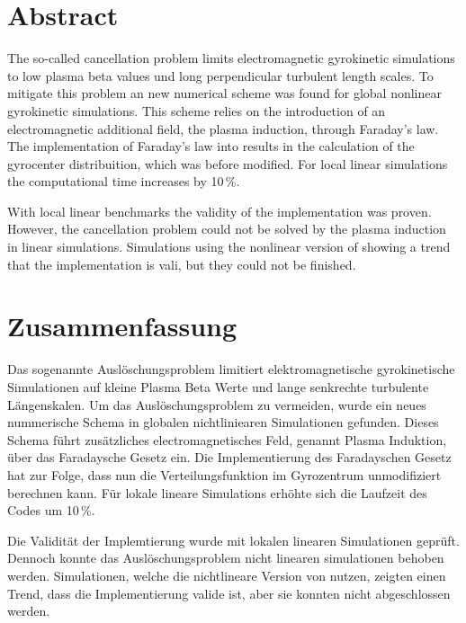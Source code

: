 \chapter*{Abstract}
\label{chap:abstractENG}

The so-called cancellation problem limits electromagnetic gyrokinetic simulations to low plasma beta values und long perpendicular turbulent length scales. To mitigate this problem an new numerical scheme was found for global nonlinear gyrokinetic simulations. This scheme relies on the introduction of an electromagnetic additional field, the plasma induction, through Faraday's law. The implementation of Faraday's law into {\gkw} results in the calculation of the gyrocenter distribuition, which was before modified. For local linear simulations the computational time increases by 10\,\%. \bigskip

With local linear benchmarks the validity of the implementation was proven. However, the cancellation problem could not be solved by the plasma induction in linear simulations. Simulations using the nonlinear version of {\gkw} showing a trend that the implementation is vali, but they could not be finished.

\chapter*{Zusammenfassung}
\label{chap:abstractDE}

Das sogenannte Auslöschungsproblem limitiert elektromagnetische gyrokinetische Simulationen auf kleine Plasma Beta Werte und lange senkrechte turbulente Längenskalen. Um das Auslöschungsproblem zu vermeiden, wurde ein neues nummerische Schema in globalen nichtliniearen Simulationen gefunden. Dieses Schema führt zusätzliches electromagnetisches Feld, genannt Plasma Induktion, über das Faradaysche Gesetz ein. Die Implementierung des Faradayschen Gesetz hat zur Folge, dass {\gkw} nun die Verteilungsfunktion im Gyrozentrum unmodifiziert berechnen kann. Für lokale lineare Simulations erhöhte sich die Laufzeit des Codes um 10\,\%.\bigskip

Die Validität der Implemtierung wurde mit lokalen linearen Simulationen geprüft. Dennoch konnte das Auslöschungsproblem nicht linearen simulationen behoben werden. Simulationen, welche die nichtlineare Version von {\gkw} nutzen, zeigten einen Trend, dass die Implementierung valide ist, aber sie konnten nicht abgeschlossen werden.